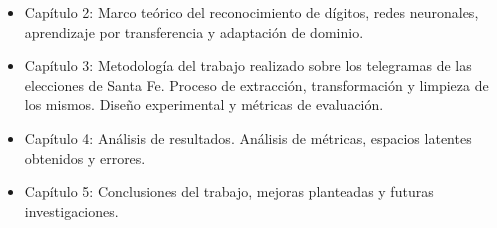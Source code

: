 \begin{itemize}
    \item Capítulo 2: Marco teórico del reconocimiento de dígitos, redes neuronales, aprendizaje por transferencia y adaptación
          de dominio.
    \item Capítulo 3: Metodología del trabajo realizado sobre los telegramas de las elecciones de Santa Fe. Proceso de
          extracción, transformación y limpieza de los mismos. Diseño experimental y métricas de evaluación.
    \item Capítulo 4: Análisis de resultados. Análisis de métricas, espacios latentes obtenidos y errores.
    \item Capítulo 5: Conclusiones del trabajo, mejoras planteadas y futuras investigaciones.
\end{itemize}